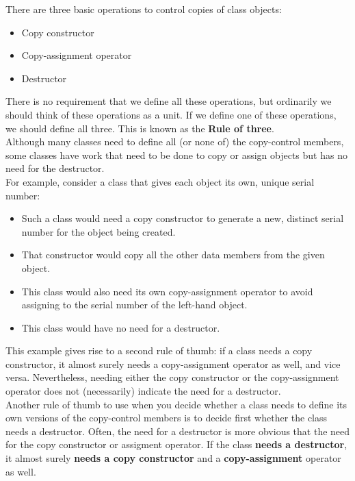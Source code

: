 There are three basic operations to control copies of class objects:

\begin{itemize}
    \item Copy constructor
    \item Copy-assignment operator
    \item Destructor
\end{itemize}

There is no requirement that we define all these operations, but ordinarily we should
think of these operations as a unit. If we define one of these operations, we should
define all three. This is known as the \textbf{Rule of three}.\\

Although many classes need to define all (or none of) the copy-control members, some classes
have work that need to be done to copy or assign objects but has no need for the destructor.\\

For example, consider a class that gives each object its own, unique serial number:
\begin{itemize}
    \item Such a class would need a copy constructor to generate a new, distinct serial
    number for the object being created.
    \item That constructor would copy all the other data members from the given object.
    \item This class would also need its own copy-assignment operator to avoid assigning
    to the serial number of the left-hand object.
    \item This class would have no need for a destructor.
\end{itemize}

This example gives rise to a second rule of thumb: if a class needs a copy constructor,
it almost surely needs a copy-assignment operator as well, and vice versa. Nevertheless,
needing either the copy constructor or the copy-assignment operator does not (necessarily)
indicate the need for a destructor.\\

Another rule of thumb to use when you decide whether a class needs to define its own versions 
of the copy-control members is to decide first whether the class needs a destructor. Often,
the need for a destructor is more obvious that the need for the copy constructor or
assigment operator. If the class \textbf{needs a destructor}, it almost surely
\textbf{needs a copy constructor} and a \textbf{copy-assignment} operator as well.

